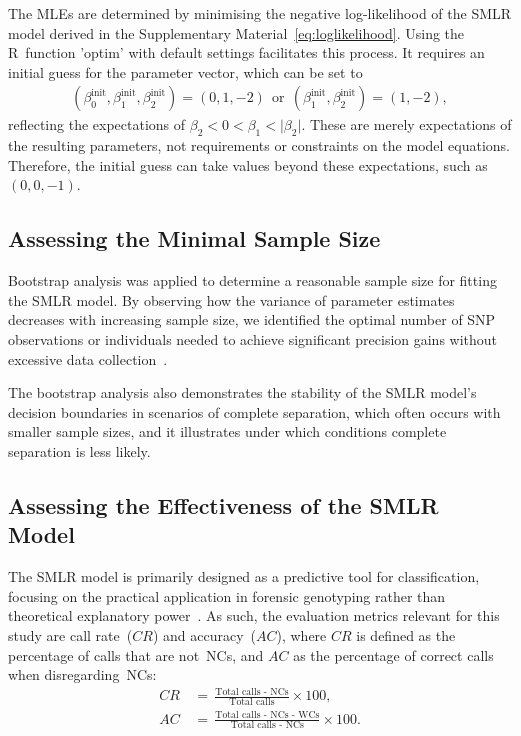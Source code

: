 \documentclass[preprint,5p,times,11pt]{elsarticle}
\begin{document}
The MLEs are determined by minimising the negative log-likelihood of the SMLR model derived in the Supplementary Material~\eqref{eq:loglikelihood}.
Using the R~function 'optim' with default settings facilitates this process.
It requires an initial guess for the parameter vector, which can be set to
\begin{align*}
\left(\beta_0^{\text{init}}, \beta_1^{\text{init}}, \beta_2^{\text{init}}\right)
=
\left(0, 1, -2\right)
\ \ \text{or} \ \ 
\left(\beta_1^{\text{init}}, \beta_2^{\text{init}}\right)
=
\left(1, -2\right),
\end{align*}
reflecting the expectations of $\beta_2 < 0 < \beta_1 < \lvert \beta_2 \rvert$.
These are merely expectations of the resulting parameters, not requirements or constraints on the model equations.
Therefore, the initial guess can take values beyond these expectations, such as $(0, 0, -1)$.


\subsection{Assessing the Minimal Sample Size}
Bootstrap analysis was applied to determine a reasonable sample size for fitting the SMLR model.
By observing how the variance of parameter estimates decreases with increasing sample size, we identified the optimal number of SNP observations or individuals needed to achieve significant precision gains without excessive data collection~\cite{efron}.

The bootstrap analysis also demonstrates the stability of the SMLR model's decision boundaries in scenarios of complete separation, which often occurs with smaller sample sizes, and it illustrates under which conditions complete separation is less likely.


\subsection{Assessing the Effectiveness of the SMLR Model}
The SMLR model is primarily designed as a predictive tool for classification, focusing on the practical application in forensic genotyping rather than theoretical explanatory power~\cite{shmueli}.
As such, the evaluation metrics relevant for this study are call rate~($CR$) and accuracy~($AC$), where $CR$ is defined as the percentage of calls that are not~NCs, and $AC$ as the percentage of correct calls when disregarding~NCs:
\begin{align*}
CR \, &= \, \frac{\text{Total calls - NCs}}{\text{Total calls}} \times 100, \\
AC \, &= \, \frac{\text{Total calls - NCs - WCs}}{\text{Total calls - NCs}} \times 100.
\end{align*}
\end{document}

